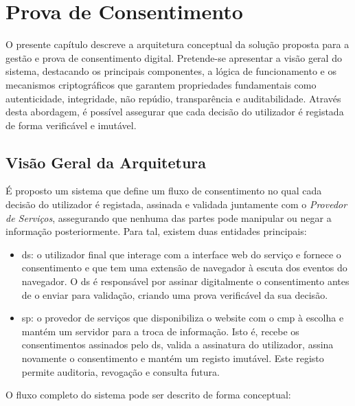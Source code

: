 \chapter{Prova de Consentimento}
\label{cap:arquitectura}

O presente capítulo descreve a arquitetura conceptual da solução proposta para a gestão e prova de consentimento digital. Pretende-se apresentar a visão geral do sistema, destacando os principais componentes, a lógica de funcionamento e os mecanismos criptográficos que garantem propriedades fundamentais como autenticidade, integridade, não repúdio, transparência e auditabilidade. Através desta abordagem, é possível assegurar que cada decisão do utilizador é registada de forma verificável e imutável.

\section{Visão Geral da Arquitetura}

É proposto um sistema que define um fluxo de consentimento no qual cada decisão do utilizador é registada, assinada e validada juntamente com o \textit{Provedor de Serviços}, assegurando que nenhuma das partes pode manipular ou negar a informação posteriormente. Para tal, existem duas entidades principais:

\begin{itemize}
    \item \acrfull{ds}: o utilizador final que interage com a interface web do serviço e fornece o consentimento e que tem uma extensão de navegador à escuta dos eventos do navegador. O \acrshort{ds} é responsável por assinar digitalmente o consentimento antes de o enviar para validação, criando uma prova verificável da sua decisão.
    \item \acrfull{sp}: o provedor de serviços que disponibiliza o website com o \acrshort{cmp} à escolha e mantém um servidor para a troca de informação. Isto é, recebe os consentimentos assinados pelo \acrshort{ds}, valida a assinatura do utilizador, assina novamente o consentimento e mantém um registo imutável. Este registo permite auditoria, revogação e consulta futura.
\end{itemize}

O fluxo completo do sistema pode ser descrito de forma conceptual:

